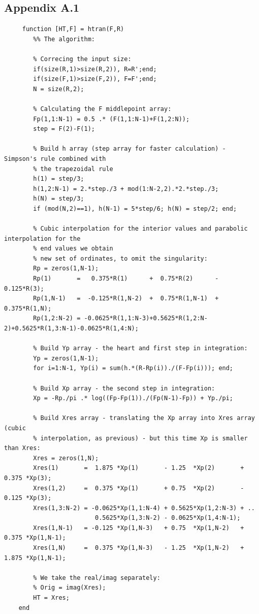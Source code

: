 \documentclass[12pt,twoside,a4paper]{article}
\numberwithin{equation}{subsection}
\numberwithin{figure}{subsection}
\begin{document}
\subsection*{Appendix A.1}
\begin{lstlisting}
	 function [HT,F] = htran(F,R)
	    %% The algorithm:
	   
	    % Correcing the input size:
	    if(size(R,1)>size(R,2)), R=R';end;
	    if(size(F,1)>size(F,2)), F=F';end;
	    N = size(R,2);
	    
	    % Calculating the F middlepoint array:
	    Fp(1,1:N-1) = 0.5 .* (F(1,1:N-1)+F(1,2:N));
	    step = F(2)-F(1);
	    
	    % Build h array (step array for faster calculation) - Simpson's rule combined with 
	    % the trapezoidal rule
	    h(1) = step/3;
	    h(1,2:N-1) = 2.*step./3 + mod(1:N-2,2).*2.*step./3;
	    h(N) = step/3;
	    if (mod(N,2)==1), h(N-1) = 5*step/6; h(N) = step/2; end;
	    
	    % Cubic interpolation for the interior values and parabolic interpolation for the 
	    % end values we obtain
	    % new set of ordinates, to omit the singularity:
	    Rp = zeros(1,N-1);
	    Rp(1)       =   0.375*R(1)      +  0.75*R(2)      - 0.125*R(3);
	    Rp(1,N-1)   =  -0.125*R(1,N-2)  +  0.75*R(1,N-1)  + 0.375*R(1,N);
	    Rp(1,2:N-2) = -0.0625*R(1,1:N-3)+0.5625*R(1,2:N-2)+0.5625*R(1,3:N-1)-0.0625*R(1,4:N);
	    
	    % Build Yp array - the heart and first step in integration:
	    Yp = zeros(1,N-1);
	    for i=1:N-1, Yp(i) = sum(h.*(R-Rp(i))./(F-Fp(i))); end;
	    
	    % Build Xp array - the second step in integration:
	    Xp = -Rp./pi .* log((Fp-Fp(1))./(Fp(N-1)-Fp)) + Yp./pi;
	    
	    % Build Xres array - translating the Xp array into Xres array (cubic
	    % interpolation, as previous) - but this time Xp is smaller than Xres:
	    Xres = zeros(1,N);
	    Xres(1)       =  1.875 *Xp(1)       - 1.25  *Xp(2)       + 0.375 *Xp(3);
	    Xres(1,2)     =  0.375 *Xp(1)       + 0.75  *Xp(2)       - 0.125 *Xp(3);
	    Xres(1,3:N-2) = -0.0625*Xp(1,1:N-4) + 0.5625*Xp(1,2:N-3) + ..
	                     0.5625*Xp(1,3:N-2) - 0.0625*Xp(1,4:N-1);
	    Xres(1,N-1)   = -0.125 *Xp(1,N-3)   + 0.75  *Xp(1,N-2)   + 0.375 *Xp(1,N-1);
	    Xres(1,N)     =  0.375 *Xp(1,N-3)   - 1.25  *Xp(1,N-2)   + 1.875 *Xp(1,N-1);
	    
	    % We take the real/imag separately:
	    % Orig = imag(Xres);
	    HT = Xres;
	end
	
	 
\end{lstlisting}
\end{document}

